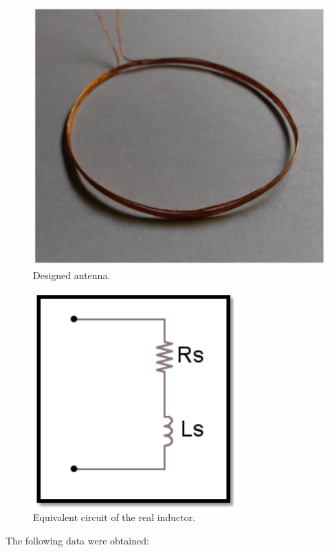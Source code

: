 \documentclass[a4paper, 10pt, conference]{ieeeconf}      %
\begin{document}
\begin{figure}[H]
\centering
\includegraphics[scale=0.3]{Images/ImagenesTesina/antena/Antena.png}
\caption{Designed antenna.}
\label{fig:antena}
\end{figure}

\begin{figure}[H]
\centering
\includegraphics[scale=0.4]{Images/ImagenesTesina/antena/Equivalente_Bobina_Serie.png}
\caption{Equivalent circuit of the real inductor.}
\label{fig:L_real}
\end{figure}


The following data were obtained:
\end{document}
